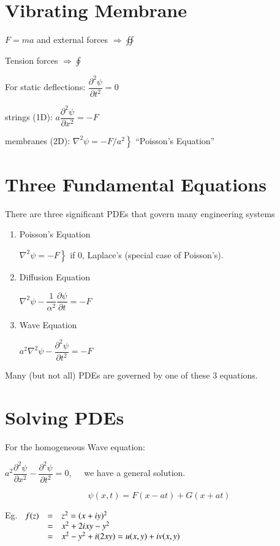 \documentclass{report}
\begin{document}
\section{Vibrating Membrane}


$F=m a$ and external forces $\Rightarrow \oiint$

Tension forces $\Rightarrow \oint$

For static deflections: $\dfrac{\partial^{2} \psi}{\partial t^{2}}=0$

strings (1D): $a \dfrac{\partial^{2} \psi}{\partial x^{2}}=-F$

membranes (2D): $\left.\nabla^{2} \psi=-F / a^{2}\right\}$ ``Poisson's Equation''

\section{Three Fundamental Equations}
There are three significant PDEs that govern many engineering systems
\begin{enumerate}
  \item Poisson's Equation

  $\left.\nabla^{2} \psi=-F\right\}$ if 0, Laplace's (special case of Poisson's).
  
  \item Diffusion Equation

  $\nabla^{2} \psi-\dfrac{1}{\alpha^{2}} \dfrac{\partial \psi}{\partial t}=-F$

  \item Wave Equation

  $a^{2} \nabla^{2} \psi-\dfrac{\partial^{2} \psi}{\partial t^{2}}=-F$
\end{enumerate}


Many (but not all) PDEs are governed by one of these 3 equations.

\section{Solving PDEs}

For the homogeneous Wave equation: 

$a^{2} \dfrac{\partial^{2} \psi}{\partial x^{2}}-\dfrac{\partial^{2} \psi}{\partial t^{2}}=0, \quad$ we have a general solution.

$$\psi(x,t)=F(x-at)+G(x+at)$$

Eg. $\begin{array}[t]{lll}
     f(z) & = & z^{2}=(x+i y)^{2}\\
     & = & x^{2}+2 i x y-y^{2}\\
     & = & x^{2}-y^{2}+i(2 x y)=u(x, y)+i v(x, y)
\end{array}$
\end{document}
